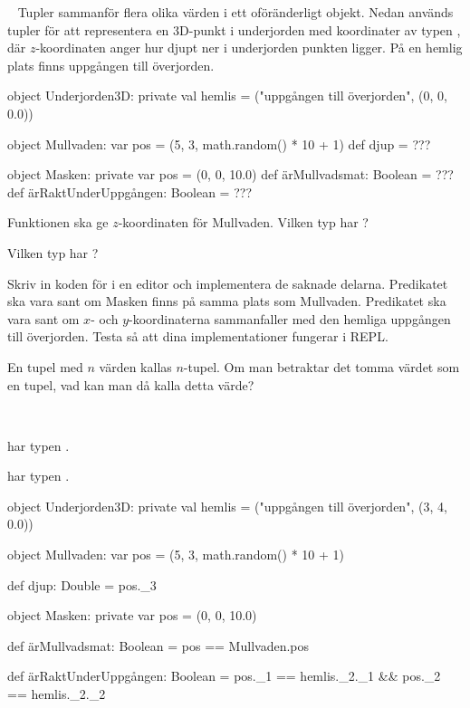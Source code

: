 \QUESTEND



\QUESTBEGIN

\Task \what~ Tupler sammanför flera olika värden i ett oföränderligt objekt. Nedan används tupler för att representera en 3D-punkt i underjorden med koordinater  av typen , där $z$-koordinaten anger hur djupt ner i underjorden punkten ligger. På en hemlig plats finns uppgången till överjorden.

\begin{Code}
object Underjorden3D:
  private val hemlis = ("uppgången till överjorden", (0, 0, 0.0))

  object Mullvaden:
    var pos = (5, 3, math.random() * 10 + 1)
    def djup  = ???

  object Masken:
    private var pos = (0, 0, 10.0)
    def ärMullvadsmat: Boolean = ???
    def ärRaktUnderUppgången: Boolean = ???
\end{Code}

\Subtask Funktionen  ska ge $z$-koordinaten för Mullvaden. Vilken typ har ?

\Subtask Vilken typ har ?

\Subtask Skriv in koden för  i en editor och implementera de saknade delarna. Predikatet  ska vara sant om Masken finns på samma plats som Mullvaden. Predikatet   ska vara sant om $x$- och $y$-koordinaterna sammanfaller med den hemliga uppgången till överjorden. Testa så att dina implementationer fungerar i REPL.

\Subtask En tupel med $n$ värden kallas $n$-tupel. Om man betraktar det tomma värdet  \code{()} som en tupel, vad kan man då kalla detta värde?

\SOLUTION

\TaskSolved \what~

\SubtaskSolved {} har typen .

\SubtaskSolved {} har typen .


\SubtaskSolved
\begin{Code}
object Underjorden3D:
  private val hemlis = ("uppgången till överjorden", (3, 4, 0.0))

  object Mullvaden:
    var pos = (5, 3, math.random() * 10 + 1)

    def djup: Double  = pos._3

  object Masken:
    private var pos = (0, 0, 10.0)

    def ärMullvadsmat: Boolean = pos == Mullvaden.pos

    def ärRaktUnderUppgången: Boolean =
      pos._1 == hemlis._2._1 && pos._2 == hemlis._2._2
\end{Code}

